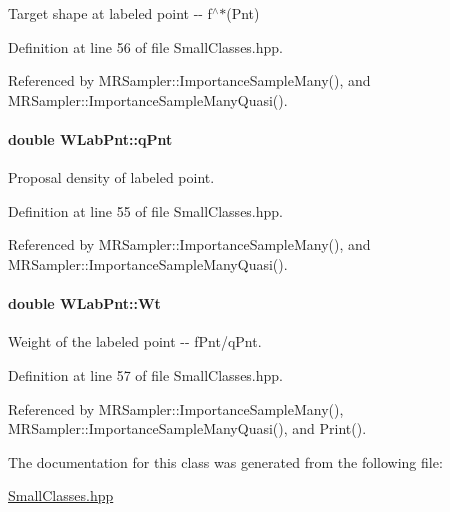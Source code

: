 \-Target shape at labeled point -\/-\/ f$^\wedge$$\ast$(\-Pnt) 



\-Definition at line 56 of file \-Small\-Classes.\-hpp.



\-Referenced by \-M\-R\-Sampler\-::\-Importance\-Sample\-Many(), and \-M\-R\-Sampler\-::\-Importance\-Sample\-Many\-Quasi().

\hypertarget{classWLabPnt_a571c18b84ec2394bb517bee7b1a225f0}{
\paragraph[{q\-Pnt}]{\setlength{\rightskip}{0pt plus 5cm}double {\bf \-W\-Lab\-Pnt\-::q\-Pnt}}}\label{classWLabPnt_a571c18b84ec2394bb517bee7b1a225f0}


\-Proposal density of labeled point. 



\-Definition at line 55 of file \-Small\-Classes.\-hpp.



\-Referenced by \-M\-R\-Sampler\-::\-Importance\-Sample\-Many(), and \-M\-R\-Sampler\-::\-Importance\-Sample\-Many\-Quasi().

\hypertarget{classWLabPnt_a570ae2d3848d909ce95291f8d7ffc573}{
\paragraph[{\-Wt}]{\setlength{\rightskip}{0pt plus 5cm}double {\bf \-W\-Lab\-Pnt\-::\-Wt}}}\label{classWLabPnt_a570ae2d3848d909ce95291f8d7ffc573}


\-Weight of the labeled point -\/-\/ f\-Pnt/q\-Pnt. 



\-Definition at line 57 of file \-Small\-Classes.\-hpp.



\-Referenced by \-M\-R\-Sampler\-::\-Importance\-Sample\-Many(), \-M\-R\-Sampler\-::\-Importance\-Sample\-Many\-Quasi(), and \-Print().



\-The documentation for this class was generated from the following file\-:\begin{DoxyCompactItemize}
\item 
\hyperlink{SmallClasses_8hpp}{\-Small\-Classes.\-hpp}\end{DoxyCompactItemize}
